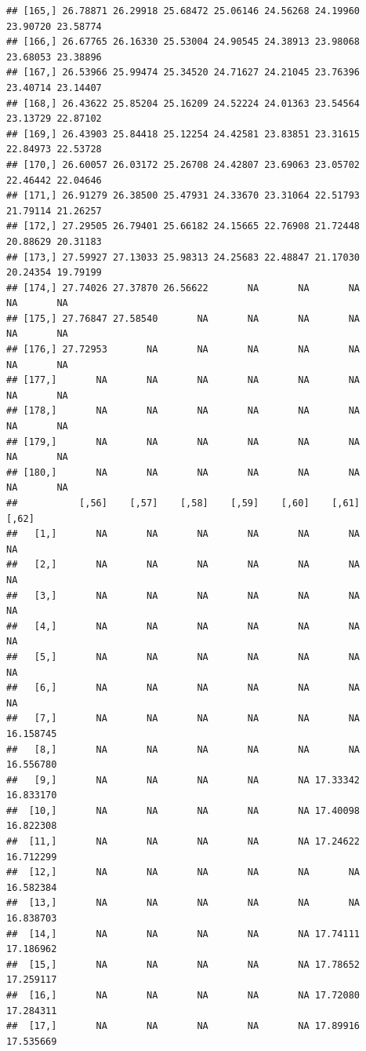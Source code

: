 \documentclass{article}\usepackage[]{graphicx}\usepackage[]{color}
\makeatletter
\newenvironment{kframe}{%
 \def\at@end@of@kframe{}%
 \ifinner\ifhmode%
  \def\at@end@of@kframe{\end{minipage}}%
  \begin{minipage}{\columnwidth}%
 \fi\fi%
 \def\FrameCommand##1{\hskip\@totalleftmargin \hskip-\fboxsep
 \colorbox{shadecolor}{##1}\hskip-\fboxsep
     \hskip-\linewidth \hskip-\@totalleftmargin \hskip\columnwidth}%
 \MakeFramed {\advance\hsize-\width
   \@totalleftmargin\z@ \linewidth\hsize
   \@setminipage}}%
 {\par\unskip\endMakeFramed%
 \at@end@of@kframe}
\newenvironment{knitrout}{}{} %
\makeatother
\begin{document}
\begin{knitrout}
\begin{kframe}
\begin{verbatim}
## [165,] 26.78871 26.29918 25.68472 25.06146 24.56268 24.19960 23.90720 23.58774
## [166,] 26.67765 26.16330 25.53004 24.90545 24.38913 23.98068 23.68053 23.38896
## [167,] 26.53966 25.99474 25.34520 24.71627 24.21045 23.76396 23.40714 23.14407
## [168,] 26.43622 25.85204 25.16209 24.52224 24.01363 23.54564 23.13729 22.87102
## [169,] 26.43903 25.84418 25.12254 24.42581 23.83851 23.31615 22.84973 22.53728
## [170,] 26.60057 26.03172 25.26708 24.42807 23.69063 23.05702 22.46442 22.04646
## [171,] 26.91279 26.38500 25.47931 24.33670 23.31064 22.51793 21.79114 21.26257
## [172,] 27.29505 26.79401 25.66182 24.15665 22.76908 21.72448 20.88629 20.31183
## [173,] 27.59927 27.13033 25.98313 24.25683 22.48847 21.17030 20.24354 19.79199
## [174,] 27.74026 27.37870 26.56622       NA       NA       NA       NA       NA
## [175,] 27.76847 27.58540       NA       NA       NA       NA       NA       NA
## [176,] 27.72953       NA       NA       NA       NA       NA       NA       NA
## [177,]       NA       NA       NA       NA       NA       NA       NA       NA
## [178,]       NA       NA       NA       NA       NA       NA       NA       NA
## [179,]       NA       NA       NA       NA       NA       NA       NA       NA
## [180,]       NA       NA       NA       NA       NA       NA       NA       NA
##           [,56]    [,57]    [,58]    [,59]    [,60]    [,61]     [,62]
##   [1,]       NA       NA       NA       NA       NA       NA        NA
##   [2,]       NA       NA       NA       NA       NA       NA        NA
##   [3,]       NA       NA       NA       NA       NA       NA        NA
##   [4,]       NA       NA       NA       NA       NA       NA        NA
##   [5,]       NA       NA       NA       NA       NA       NA        NA
##   [6,]       NA       NA       NA       NA       NA       NA        NA
##   [7,]       NA       NA       NA       NA       NA       NA 16.158745
##   [8,]       NA       NA       NA       NA       NA       NA 16.556780
##   [9,]       NA       NA       NA       NA       NA 17.33342 16.833170
##  [10,]       NA       NA       NA       NA       NA 17.40098 16.822308
##  [11,]       NA       NA       NA       NA       NA 17.24622 16.712299
##  [12,]       NA       NA       NA       NA       NA       NA 16.582384
##  [13,]       NA       NA       NA       NA       NA       NA 16.838703
##  [14,]       NA       NA       NA       NA       NA 17.74111 17.186962
##  [15,]       NA       NA       NA       NA       NA 17.78652 17.259117
##  [16,]       NA       NA       NA       NA       NA 17.72080 17.284311
##  [17,]       NA       NA       NA       NA       NA 17.89916 17.535669

\end{verbatim}
\end{kframe}
\end{knitrout}
\end{document}
